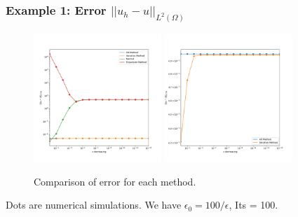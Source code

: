 \documentclass{beamer}
\begin{document}
    \begin{frame}
        \frametitle{Example 1: Error $||u_h-u||_{L^2(\Omega)}$}
\begin{figure}
            \centering
            \includegraphics[width=0.43\textwidth]{Example_1_Error_All.png} 
            \qquad
            \includegraphics[width=0.43\textwidth]{Example_1_Error_Some.png} 
            \label{fig:example}
            \caption{Comparison of error for each method.}
        \end{figure}
    Dots are numerical simulations. We have $\epsilon_0 = 100/\epsilon$, Its = 100.
    \end{frame}
    
\end{document}
